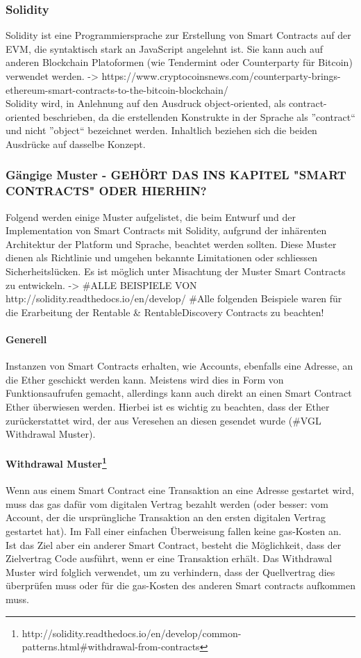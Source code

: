 \subsubsection{Solidity}
Solidity ist eine Programmiersprache zur Erstellung von Smart Contracts auf der \acrfull{EVM}, die syntaktisch stark an JavaScript angelehnt ist. Sie kann auch auf anderen Blockchain Platoformen (wie Tendermint oder Counterparty für Bitcoin) verwendet werden. -> https://www.cryptocoinsnews.com/counterparty-brings-ethereum-smart-contracts-to-the-bitcoin-blockchain/\\Solidity wird, in Anlehnung auf den Ausdruck object-oriented, als contract-oriented beschrieben, da die erstellenden Konstrukte in der Sprache als ''contract`` und nicht ''object`` bezeichnet werden. Inhaltlich beziehen sich die beiden Ausdrücke auf dasselbe Konzept.

\subsubsection{Gängige Muster - GEHÖRT DAS INS KAPITEL "SMART CONTRACTS" ODER HIERHIN?}
Folgend werden einige Muster aufgelistet, die beim Entwurf und der Implementation von Smart Contracts mit Solidity, aufgrund der inhärenten Architektur der Platform und Sprache, beachtet werden sollten. Diese Muster dienen als Richtlinie und umgehen bekannte Limitationen oder schliessen Sicherheitslücken. Es ist möglich unter Misachtung der Muster Smart Contracts zu entwickeln. -> \#ALLE BEISPIELE VON http://solidity.readthedocs.io/en/develop/
\#Alle folgenden Beispiele waren für die Erarbeitung der Rentable \& RentableDiscovery Contracts zu beachten!

\paragraph{Generell}
Instanzen von Smart Contracts erhalten, wie Accounts, ebenfalls eine Adresse, an die Ether geschickt werden kann. Meistens wird dies in Form von Funktionsaufrufen gemacht, allerdings kann auch direkt an einen Smart Contract Ether überwiesen werden. Hierbei ist es wichtig zu beachten, dass der Ether zurückerstattet wird, der aus Veresehen an diesen gesendet wurde (\#VGL Withdrawal Muster).

\paragraph{Withdrawal Muster\footnote{http://solidity.readthedocs.io/en/develop/common-patterns.html\#withdrawal-from-contracts}}
Wenn aus einem Smart Contract eine Transaktion an eine Adresse gestartet wird, muss das gas dafür vom digitalen Vertrag bezahlt werden (oder besser: vom Account, der die ursprüngliche Transaktion an den ersten digitalen Vertrag gestartet hat). Im Fall einer einfachen Überweisung fallen keine gas-Kosten an. Ist das Ziel aber ein anderer Smart Contract, besteht die Möglichkeit, dass der Zielvertrag Code ausführt, wenn er eine Transaktion erhält. Das Withdrawal Muster wird folglich verwendet, um zu verhindern, dass der Quellvertrag dies überprüfen muss oder für die gas-Kosten des anderen Smart contracts aufkommen muss.

